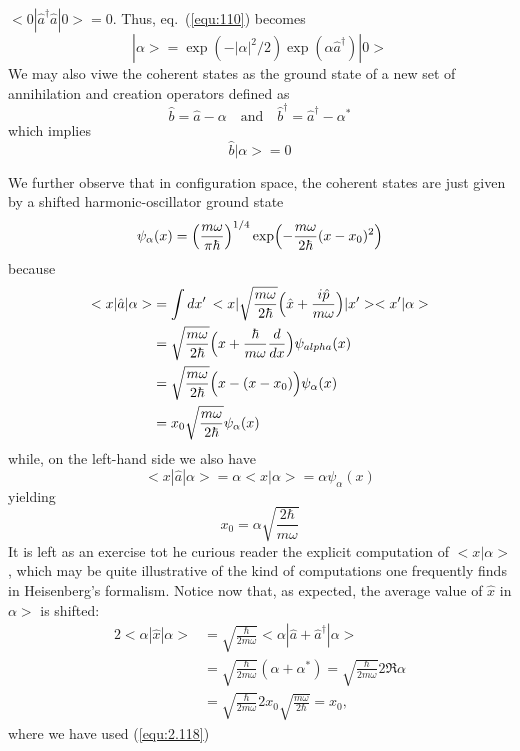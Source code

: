 $<0|\hat{a}^{\dagger}\hat{a}|0> = 0$. Thus,
eq.~(\ref{equ:110})  becomes
\begin{equation}
  |\alpha> = \exp(-|\alpha|^2/2)
  \exp(\alpha\hat{a}^{\dagger})|0>
  \label{equ:2.112}
\end{equation}
We may also viwe the coherent states as the ground state of
a new set of annihilation and creation operators defined as
\begin{equation}
  \hat{b} = \hat{a} - \alpha \quad \text{and}\quad
  \hat{b}^{\dagger} = \hat{a}^{\dagger} - \alpha^*
  \label{equ:2.113}
\end{equation}
which implies
\begin{equation}
  \hat{b}|\alpha> = 0
  \label{equ:2.114}
\end{equation}

We further observe that in configuration space, the coherent
states are just given by a shifted harmonic-oscillator
ground state
\begin{equation}
  \psi_{\alpha}(x) =
  \Bigl(\frac{m\omega}{\pi\hbar}\Bigr)^{1/4}
  \exp\Bigl(-\frac{m\omega}{2\hbar}(x-x_0)^2\Bigr)
  \label{equ:2.115}
\end{equation}
because
  \begin{alignat}{2}
    <x|\hat{a}|\alpha> &= \int dx' \, <x|
    \sqrt{\frac{m\omega}{2\hbar}} \Bigl(
    \hat{x} + \frac{i\hat{p}}{m\omega}
    \Bigr)|x'> <x'|\alpha>\nonumber\\
    &=
    \sqrt{\frac{m\omega}{2\hbar}}
    \Bigl(
      x + \frac{\hbar}{m\omega}\frac{d}{dx}
    \Bigr)
    \psi_{alpha}(x)\nonumber\\
    &=
    \sqrt{\frac{m\omega}{2\hbar}}
    \Bigl(
      x-(x-x_0)
      \Bigr)\psi_{\alpha}(x)\nonumber\\
      &=
      x_0
      \sqrt{\frac{m\omega}{2\hbar}} \psi_{\alpha}(x)
      \label{equ:2.116}
  \end{alignat}
while, on the left-hand side we also have
\begin{equation}
  <x|\hat{a}|\alpha> = \alpha<x|\alpha> =
  \alpha\psi_{\alpha}(x)
  \label{equ:2.117}
\end{equation}
yielding
\begin{equation}
  x_0 = \alpha \sqrt{\frac{2\hbar}{m\omega}}
  \label{equ:2.118}
\end{equation}
It is left as an exercise tot he curious reader the explicit
computation of $<x|\alpha>$, which may be quite illustrative
of the kind of computations one frequently finds in
Heisenberg's formalism.
Notice now that, as expected, the average value of $\hat{x}$
in $\alpha>$ is shifted:
  \begin{alignat}{2}
    <\alpha|\hat{x}|\alpha> &= 
    \sqrt{\frac{\hbar}{2m\omega}}
    <\alpha|\hat{a}+\hat{a}^{\dagger}|\alpha> \nonumber\\
    &=
    \sqrt{\frac{\hbar}{2m\omega}}
    (\alpha + \alpha^*) = 
    \sqrt{\frac{\hbar}{2m\omega}} 2 \Re \alpha \nonumber\\
    &=
    \sqrt{\frac{\hbar}{2m\omega}}
    2x_0 \sqrt{\frac{m\omega}{2\hbar}} = x_0,
    \label{equ:2.119}
  \end{alignat}
where we have used (\ref{equ:2.118})
